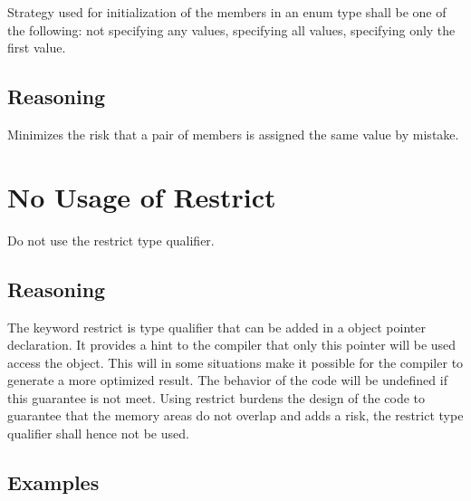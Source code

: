 \documentclass{report}
\newcommand\codelstwidth{0.48}
\begin{document}
Strategy used for initialization of the members in an enum type shall be one of the following: not specifying any values, specifying all values, specifying only the first value.

\subsection{Reasoning}

Minimizes the risk that a pair of members is assigned the same value by mistake.

\noindent
\begin{minipage}[t]{\codelstwidth\linewidth}

\end{minipage}
\hfill
\begin{minipage}[t]{\codelstwidth\linewidth}

\end{minipage}

\section{No Usage of Restrict}

Do not use the restrict type qualifier.

\subsection{Reasoning}

The keyword restrict is type qualifier that can be added in a object pointer declaration. It provides a hint to the compiler that only this pointer will be used access the object. This will in some situations make it possible for the compiler to generate a more optimized result. The behavior of the code will be undefined if this guarantee is not meet. Using restrict burdens the design of the code to guarantee that the memory areas do not overlap and adds a risk, the restrict type qualifier shall hence not be used.

\subsection{Examples}

\noindent
\begin{minipage}[t]{\codelstwidth\linewidth}

\end{minipage}
\hfill
\begin{minipage}[t]{\codelstwidth\linewidth}

\end{minipage}
\end{document}
